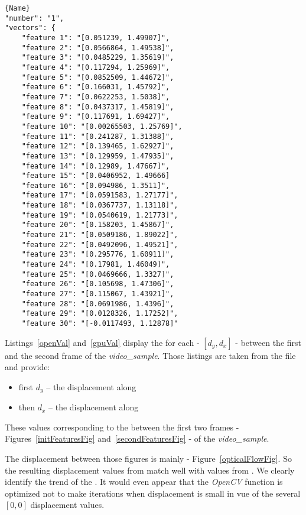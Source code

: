 \begin{minipage}{.45\textwidth}
	\begin{lstlisting}[caption={\code{compute\_lk\_gpu} values},frame=tlrb,basicstyle=\tiny,label=gpuVal]{Name}
"number": "1",
"vectors": {
	"feature 1": "[0.051239, 1.49907]",
	"feature 2": "[0.0566864, 1.49538]",
	"feature 3": "[0.0485229, 1.35619]",
	"feature 4": "[0.117294, 1.25969]",
	"feature 5": "[0.0852509, 1.44672]",
	"feature 6": "[0.166031, 1.45792]",
	"feature 7": "[0.0622253, 1.5038]",
	"feature 8": "[0.0437317, 1.45819]",
	"feature 9": "[0.117691, 1.69427]",
	"feature 10": "[0.00265503, 1.25769]",
	"feature 11": "[0.241287, 1.31388]",
	"feature 12": "[0.139465, 1.62927]",
	"feature 13": "[0.129959, 1.47935]",
	"feature 14": "[0.12989, 1.47667]",
	"feature 15": "[0.0406952, 1.49666]
	"feature 16": "[0.094986, 1.3511]",
	"feature 17": "[0.0591583, 1.27177]",
	"feature 18": "[0.0367737, 1.13118]",
	"feature 19": "[0.0540619, 1.21773]",
	"feature 20": "[0.158203, 1.45867]",
	"feature 21": "[0.0509186, 1.89022]",
	"feature 22": "[0.0492096, 1.49521]",
	"feature 23": "[0.295776, 1.60911]",
	"feature 24": "[0.17981, 1.46049]",
	"feature 25": "[0.0469666, 1.3327]",
	"feature 26": "[0.105698, 1.47306]",
	"feature 27": "[0.115067, 1.43921]",
	"feature 28": "[0.0691986, 1.4396]",
	"feature 29": "[0.0128326, 1.17252]",
	"feature 30": "[-0.0117493, 1.12878]"
\end{lstlisting}
\end{minipage}

Listings~\ref{openVal} and~\ref{gpuVal} display the  for each \feat{} - $[d_{y},d_{x}]$ - between the first and the second frame of the \emph{video\_sample}. Those listings are taken from the  file and provide:
\begin{itemize}
	\item first $d_{y}$ -- the displacement along 
	\item then $d_{x}$ -- the displacement along 
\end{itemize}

These values corresponding to the \flow{} between the first two frames - Figures~\ref{initFeaturesFig} and~\ref{secondFeaturesFig} - of the \emph{video\_sample}.

The displacement between those figures is mainly  - Figure~\ref{opticalFlowFig}. So the resulting displacement values from  match well with values from . We clearly identify the  trend of the \flow. It would even appear that the \emph{OpenCV} function is optimized not to make iterations when displacement is small in vue of the several $[0,0]$ displacement values.

